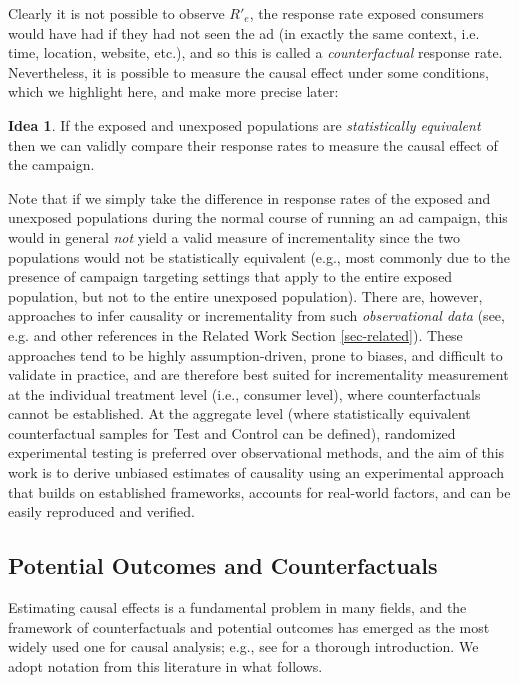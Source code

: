 \documentclass[11pt,a4paper]{article}
\theoremstyle{definition}
\theoremstyle{remark}
\theoremstyle{definition}
\theoremstyle{definition}
\theoremstyle{definition}
\theoremstyle{definition}
\newtheorem{idea}{Idea}[section]
\theoremstyle{definition}
\theoremstyle{definition}
\begin{document}
Clearly it is not possible to observe $R'_e$, the response rate exposed consumers would have had if they had not seen the ad (in exactly the same context, i.e. time, location, website, etc.), and so this is called a {\em counterfactual} response rate. 
Nevertheless, it is possible to measure the causal effect under some conditions, which we highlight here, and make more precise later:
\begin{idea}\label{idea-stat}
If the exposed and unexposed populations are {\em statistically equivalent} then we can validly compare their response rates to measure the causal effect of the campaign. 
\end{idea}
Note that if we simply take the difference in response rates of the exposed and unexposed populations during the normal course of running an ad campaign, this would in general \textit{not} yield a valid measure of incrementality since the two populations would not be statistically equivalent (e.g., most commonly due to the presence of campaign targeting settings that apply to the entire exposed population, but not to the entire unexposed population).
There are, however, approaches to infer causality or incrementality from such \textit{observational data} (see, e.g. \cite{Austin_An_2011} and other references in the Related Work Section \ref{sec-related}). These approaches tend to be highly assumption-driven, prone to biases, and difficult to validate in practice, and are therefore best suited for incrementality measurement at the individual treatment level (i.e., consumer level), where counterfactuals cannot be established. At the aggregate level (where statistically equivalent counterfactual samples for Test and Control can be defined), randomized experimental testing is preferred over observational methods, and the aim of this work is to derive unbiased estimates of causality using an experimental approach that builds on established frameworks, accounts for real-world factors, and can be easily reproduced and verified.


\subsection{Potential Outcomes and Counterfactuals} \label{sec-potential}


Estimating causal effects is a fundamental problem in many fields, and the framework of counterfactuals and potential outcomes has emerged as 
the most widely used one for causal analysis; e.g., see \cite{Little_Causal_2000} for a thorough introduction. 
We adopt notation from this literature in what follows.
\end{document}
